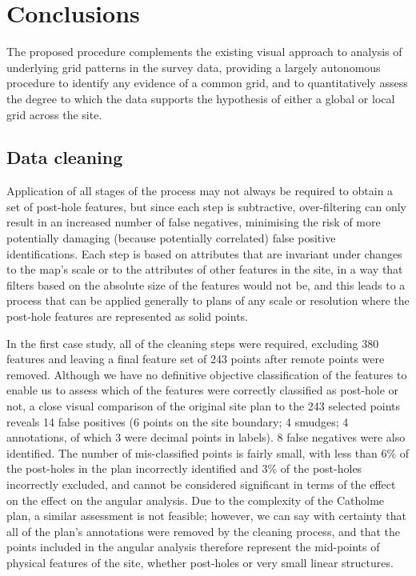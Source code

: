 \documentclass[../../ArchStats.tex]{subfiles}
\begin{document}
\section{Conclusions}
\label{sec:concl}

The proposed procedure complements the existing visual  approach to analysis of underlying grid patterns in the survey data, providing a largely autonomous procedure  to identify any evidence of a common grid, and to quantitatively assess the degree to which the data supports the hypothesis of either a global or local grid across the site.  

\subsection{Data cleaning}
Application of all stages of the process may not always be required to obtain a set of post-hole features, but since each step is subtractive, over-filtering can only result in an increased number of false negatives, minimising the risk of more potentially damaging (because potentially correlated) false positive identifications. Each step is based on attributes that are invariant under changes to the map's scale or to the attributes of other features in the site, in a way that filters based on the absolute size of the features would not be, and this leads to a process that can be applied generally to plans of any scale or resolution where the post-hole features are represented as solid points.


In the first case study, all of the cleaning steps were required, excluding 380 features and leaving a final feature set of 243 points after remote points were removed. Although we have no definitive objective classification of the features to enable us to assess which of the features were correctly classified as post-hole or not, a close visual comparison of the original site plan to the 243 selected points reveals  14 false positives (6 points on the site boundary; 4 smudges; 4 annotations, of which 3 were decimal points in labels). 8 false negatives were also identified. The number of mis-classified points is fairly small, with less than 6\% of the post-holes in the plan incorrectly identified and 3\% of the post-holes incorrectly excluded, and cannot be considered significant in terms of the effect on the effect on the angular analysis. Due to the complexity of the Catholme plan, a similar assessment is not feasible; however, we can say with certainty that all of the plan's annotations were removed by the cleaning process, and that the points included in the angular analysis therefore represent the mid-points of physical features of the site, whether post-holes or very small linear structures. 
\end{document}
